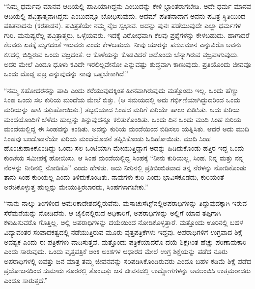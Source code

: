 “ನಿಮ್ಮ ಧರ್ಮವು ಮಾನವ ಆದಿಯಲ್ಲಿ ಪಾಪಿಯಾಗಿದ್ದನು ಎಂಬುದನ್ನು ಕೇಳಿ ಭ್ರಾಂತರಾಗಬೇಡಿ. ಅದೇ ಧರ್ಮ ಮಾನವ ಆದಿಯಲ್ಲಿ ಪವಿತ್ರಾತ್ಮನಾಗಿದ್ದನು ಎಂಬುದನ್ನೂ ಬೋಧಿಸುವುದು. ಆದಮ್​ ಪತಿತನಾದಾಗ ಅವನು ಪವಿತ್ರ ಸ್ಥಿತಿಯಿಂದ ಪತಿತನಾ\break ದನು (ಕರತಾಡನ). ಪವಿತ್ರತೆಯೇ ನಮ್ಮ ನೈಜ ಸ್ವಭಾವ. ಅದನ್ನು ಪುನಃ ಪಡೆಯುವುದೇ ಎಲ್ಲಾ ಧರ್ಮಗಳ ಗುರಿ. ಮನುಷ್ಯರೆಲ್ಲ ಪವಿತ್ರಾತ್ಮರು, ಒಳ್ಳೆಯವರು. ಇದಕ್ಕೆ ವಿರೋಧವಾಗಿ ಕೆಲವು ಪ್ರಶ್ನೆಗಳನ್ನು ಕೇಳಬಹುದು. ಹಾಗಾದರೆ ಕೆಲವರು ಏತಕ್ಕೆ ಮೃಗದಂತೆ ಇರುವರು ಎಂದು ಕೇಳಬಹುದು. ನೀವು ಯಾರನ್ನು ಪಶುಸಮಾನ ಎನ್ನುವಿರೊ ಅವನು ಕಸದಲ್ಲಿ ಬಿದ್ದಿರುವ ಒಂದು ವಜ್ರದಂತೆ. ಆ ಕೊಳೆಯನ್ನು ಕೊಡವಿದರೆ ಅದೊಂದು ಚೆನ್ನಾಗಿರುವ ವಜ್ರವಾಗುವುದು. ಅದರ ಮೇಲೆ ಎಂದೂ ಧೂಳು ಕವಿದೇ ಇರಲಿಲ್ಲವೇನೋ ಎನ್ನುವಷ್ಟು ಶುದ್ಧವಾಗಿ ಕಾಣುವುದು. ಪ್ರತಿಯೊಂದು ಜೀವವೂ ಒಂದು ದೊಡ್ಡ ವಜ್ರ ಎನ್ನುವುದನ್ನು ನಾವು ಒಪ್ಪಬೇಕಾಗಿದೆ.”

“ನಮ್ಮ ಸಹೋದರನನ್ನು ಪಾಪಿ ಎಂದು ಕರೆಯುವುದಕ್ಕಿಂತ ಹೀನವಾಗಿರುವುದು ಮತ್ತೊಂದು ಇಲ್ಲ. ಒಂದು ಹೆಣ್ಣು ಸಿಂಹ ಒಂದು ಸಲ ಕುರಿಯ ಮಂದೆಯ ಮೇಲೆ ಬಿತ್ತು. (ಆ ಸಮಯದಲ್ಲಿ ಅದು ಗರ್ಭಿಣಿಯಾಗಿದ್ದುದರಿಂದ ಒಂದು ಮರಿಯನ್ನು ಹಾಕಿ ಸತ್ತುಹೋಯಿತು.) ತಬ್ಬಲಿಯಾದ ಸಿಂಹದ ಮರಿಗೆ ಕುರಿಯೇ ಹಾಲು ಕುಡಿಸಿತು. ಅದು ಕುರಿಯ ಮಂದೆಯೊಂದಿಗೆ ಬೆಳೆದು ಹುಲ್ಲನ್ನು ತಿನ್ನುವುದನ್ನೂ ಕಲಿತುಕೊಂಡಿತು. ಒಂದು ದಿನ ಒಂದು ಮುದಿ ಸಿಂಹ ಕುರಿಯ ಮಂದೆಯಲ್ಲಿದ್ದ ಈ ಸಿಂಹವನ್ನು ಕಂಡಿತು. ಅದನ್ನು ಕುರಿಯ ಮಂದೆಯಿಂದ ಬಿಡಿಸಲು ಯತ್ನಿಸಿತು. ಆದರೆ ಅದು ಮುದಿ ಸಿಂಹವು ಬಂದೊಡನೆಯೇ ಕುರಿಯ ಮಂದೆಯೊಡನೆ ತಪ್ಪಿಸಿಕೊಂಡು ಓಡಿಹೋಯಿತು. ಮುದಿ ಸಿಂಹ ಹೊಂಚುಹಾಕಿಕೊಂಡಿದ್ದು ಒಂದು ಸಲ ಒಂಟಿಯಾಗಿ ಮೇಯುತ್ತಿದ್ದಾಗ ಅದನ್ನು ಹಿಡಿದುಕೊಂಡು ಹತ್ತಿರ ಇದ್ದ ಒಂದು ಕುಂಟೆಯ ಸಮೀಪಕ್ಕೆ ಹೋಯಿಸು. ಆ ಸಿಂಹ ಮಂದೆಯಲ್ಲಿದ್ದ ಸಿಂಹಕ್ಕೆ “ನೀನು ಕುರಿಯಲ್ಲ, ಸಿಂಹ. ನಿನ್ನ ಮತ್ತು ನನ್ನ ನೆರಳನ್ನು ನೀರಿನಲ್ಲಿ ನೋಡಿಕೊ” ಎಂದು ಹೇಳಿತು. ಅದು ನೀರಿನಲ್ಲಿ ಪ್ರತಿಬಿಂಬಿತವಾದ ತನ್ನ ನೆರಳನ್ನು ನೋಡಿಕೊಂಡು ತಾನು ಸಿಂಹ ಕುರಿಯಲ್ಲ ಎಂದು ತಿಳಿದುಕೊಂಡಿತು. ನಾವುಗಳು ಕುರಿ ಎಂದು ಭಾವಿಸಕೂಡದು, ಕುರಿಯಂತೆ ಅರಚಿಕೊಳ್ಳುತ್ತ ಹುಲ್ಲನ್ನು ಮೇಯುತ್ತಿರಬಾರದು, ಸಿಂಹಗಳಾಗಬೇಕು.”

“ನಾನು ನಾಲ್ಕು ತಿಂಗಳಿಂದ ಅಮೆರಿಕಾದೇಶದಲ್ಲಿರುವೆನು. ಮಸಾಚುಸೆಟ್ಸ್​ನಲ್ಲಿ\break ಅಪರಾಧಿಗಳನ್ನು ತಿದ್ದುವುದಕ್ಕಾಗಿ ಇರುವ ಸೆರೆಮನೆಯನ್ನು ನೋಡಿದೆನು. ಆ ಜೈಲಿನಲ್ಲಿರುವ ಅಧಿಕಾರಿಗೆ, ಅಪರಾಧಿಗಳನ್ನು ಅಲ್ಲಿಗೆ ಯಾವ ತಪ್ಪಿಗಾಗಿ ಕಳುಹಿಸುವರೊ ಗೊತ್ತಿಲ್ಲ. ಅಲ್ಲಿ ಅಪರಾಧಿಗಳನ್ನು ದಯೆಯಿಂದ ನೋಡಿಕೊಳ್ಳತ್ತಾರೆ. ಮತ್ತೊಂದು ಊರಿನಲ್ಲಿ ಬಹಳ ವಿದ್ಯಾವಂತರ ಸಂಪಾದಕತ್ವದಲ್ಲಿ ನಡೆಯುತ್ತಿರುವ ಮೂರು ವೃತ್ತಪತ್ರಿಕೆಗಳು ಇದ್ದವು. ಅಪರಾಧಿಗಳಿಗೆ ಉಗ್ರವಾದ ಶಿಕ್ಷೆ ಅವಶ್ಯಕ ಎಂದು ಈ ಪತ್ರಿಕೆಗಳು ವಾದಿಸುತ್ತವೆ. ಮತ್ತೊಂದು ಪತ್ರಿಕೆಯಾದರೊ ದಯೆ ಶಿಕ್ಷೆಗಿಂತ ಹೆಚ್ಚು ಪರಿಣಾಮಕಾರಿ ಎಂದು ಸಾರುವುದು. ಒಂದು ವೃತ್ತಪತ್ರಿಕೆ ಅಂಕಿ ಅಂಶಗಳ ಆಧಾರದ ಮೇಲೆ ಉಗ್ರ ಶಿಕ್ಷೆಯನ್ನು ಪಡೆದ ನೂರು ಅಪರಾಧಿಗಳಲ್ಲಿ ಐವತ್ತು ಜನ ಮಾತ್ರ ತಮ್ಮ ಜೀವನವನ್ನು ಸರಿಪಡಿಸಿಕೊಂಡಿರುವರು ಎಂದೂ ಬಹಳ ಕಡಿಮೆ ಶಿಕ್ಷೆ ಪಡೆದ ಪ್ರಯೋಜನದಿಂದ ಸುಮಾರು ನೂರರಲ್ಲಿ ತೊಂಬತ್ತು ಜನ ಜೀವನದಲ್ಲಿ ಉದ್ಯೋಗಗಳನ್ನು ಅವಲಂಬಿಸಿ ಉತ್ತಮರಾದರು ಎಂದೂ ಸಾರುತ್ತದೆ.”

